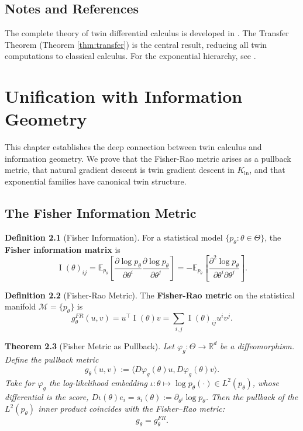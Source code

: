 \documentclass[11pt,twoside]{book}
\theoremstyle{plain}
\newtheorem{theorem}{Theorem}[chapter]
\theoremstyle{definition}
\newtheorem{definition}[theorem]{Definition}
\theoremstyle{remark}
\newcommand{\R}{\mathbb{R}}
\newcommand{\E}{\mathbb{E}}
\newcommand{\Kln}{K_{\ln}}
\DeclareMathOperator{\Fisher}{I}
\newcommand{\pp}[2]{\frac{\partial #1}{\partial #2}}
\begin{document}
\section{Notes and References}
\label{sec:ch2_notes}

The complete theory of twin differential calculus is developed in \cite{nembe2025}. The Transfer Theorem (Theorem \ref{thm:transfer}) is the central result, reducing all twin computations to classical calculus. For the exponential hierarchy, see \cite{grossman1972}.


\chapter{Unification with Information Geometry}
\label{ch:info_geometry}

This chapter establishes the deep connection between twin calculus and information geometry. We prove that the Fisher-Rao metric arises as a pullback metric, that natural gradient descent is twin gradient descent in $\Kln$, and that exponential families have canonical twin structure.

\section{The Fisher Information Metric}
\label{sec:fisher_metric}

\begin{definition}[Fisher Information]
    For a statistical model $\{p_\theta : \theta \in \Theta\}$, the \textbf{Fisher information matrix} is
    \[
    \Fisher(\theta)_{ij} = \E_{p_\theta}\left[\pp{\log p_\theta}{\theta^i} \pp{\log p_\theta}{\theta^j}\right] = -\E_{p_\theta}\left[\frac{\partial^2 \log p_\theta}{\partial \theta^i \partial \theta^j}\right].
    \]
\end{definition}

\begin{definition}[Fisher-Rao Metric]
    The \textbf{Fisher-Rao metric} on the statistical manifold $\mathcal{M} = \{p_\theta\}$ is
    \[
    g_\theta^{FR}(u, v) = u^\top \Fisher(\theta) v = \sum_{i,j} \Fisher(\theta)_{ij} u^i v^j.
    \]
\end{definition}

\begin{theorem}[Fisher Metric as Pullback]
    \label{thm:fisher_pullback}
    Let $\varphi_g : \Theta \to \R^d$ be a diffeomorphism. Define the pullback metric
    \[
    g_\theta(u, v) := \langle D\varphi_g(\theta) u, D\varphi_g(\theta) v \rangle.
    \]
    Take for $\varphi_g$ the log-likelihood embedding
    $\iota : \theta \mapsto \log p_\theta(\cdot) \in L^2(p_\theta)$, whose
    differential is the score, $D\iota(\theta) e_i = s_i(\theta) :=
    \partial_{\theta^i} \log p_\theta$. Then the pullback of the $L^2(p_\theta)$
    inner product coincides with the Fisher--Rao metric:
    \[
    g_\theta = g_\theta^{FR}.
    \]
\end{theorem}
\end{document}
